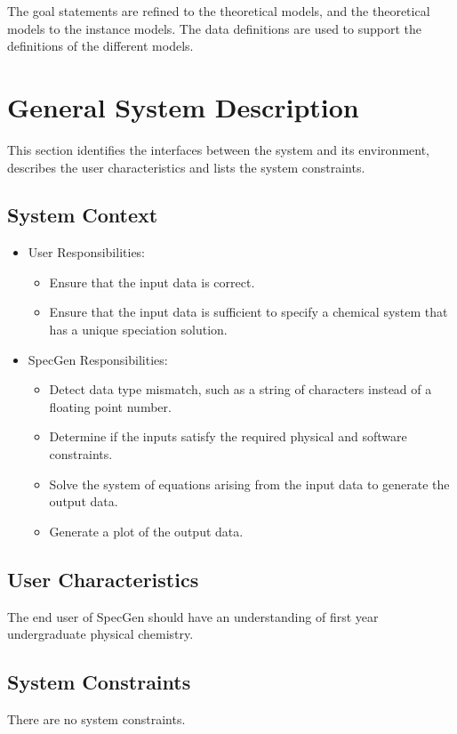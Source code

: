 \documentclass[12pt]{article}
\newcommand{\progname}{SpecGen} %
\begin{document}
The goal statements are refined to the theoretical models, and the theoretical 
models to the instance models. The data definitions are used to support the 
definitions of the different models.

\section{General System Description}
This section identifies the interfaces between the system and its environment,
describes the user characteristics and lists the system constraints.

\subsection{System Context}

\begin{itemize}
\item User Responsibilities:
\begin{itemize}
\item Ensure that the input data is correct.
\item Ensure that the input data is sufficient to specify a chemical system 
that has a unique speciation solution.
\end{itemize}
\item \progname{} Responsibilities:
\begin{itemize}
\item Detect data type mismatch, such as a string of characters instead of a
  floating point number.
\item Determine if the inputs satisfy the required physical and software 
  constraints.
\item Solve the system of equations arising from the input data to generate 
  the output data.
\item Generate a plot of the output data.
\end{itemize}
\end{itemize}

\subsection{User Characteristics} \label{SecUserCharacteristics}
The end user of \progname{} should have an understanding of first year 
undergraduate physical chemistry.

\subsection{System Constraints}
There are no system constraints.
\end{document}
